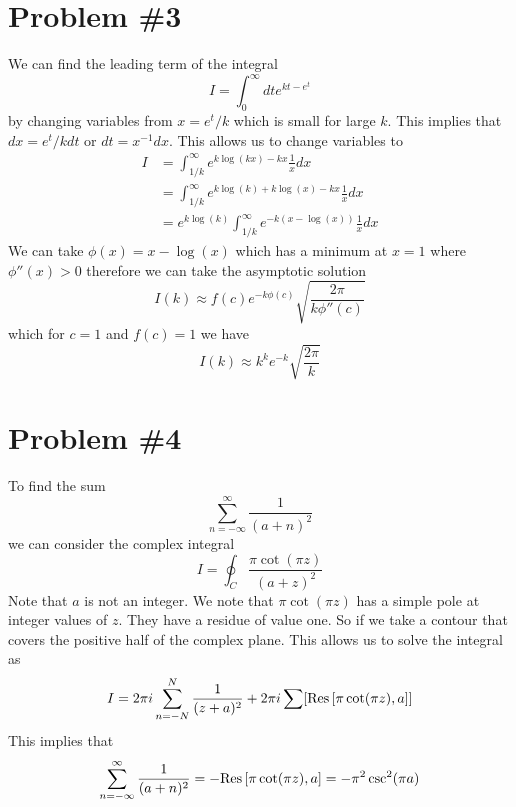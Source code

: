 \documentclass[11pt]{article}
\numberwithin{equation}{section}
\begin{document}
\pagebreak

\section{Problem \#3}
We can find the leading term of the integral
$$I = \int_{0}^{\infty}dte^{kt-e^t}$$
by changing variables from $x = e^{t}/k$ which is small for large $k$. This implies that
$dx = e^{t}/kdt$ or $dt = x^{-1}dx$. This allows us to change variables to
\begin{align*}
I &= \int_{1/k}^{\infty}e^{k\log(kx)-kx}\frac{1}{x}dx\\
&= \int_{1/k}^{\infty}e^{k\log(k)+k\log(x)-kx}\frac{1}{x}dx\\
&= e^{k\log(k)}\int_{1/k}^{\infty}e^{-k(x-\log(x))}\frac{1}{x}dx
\end{align*}
We can take $\phi(x) = x-\log(x)$ which has a minimum at $x=1$ where $\phi''(x)>0$ therefore
we can take the asymptotic solution
$$I(k) \approx f(c)e^{-k\phi(c)}\sqrt{\frac{2\pi}{k\phi''(c)}}$$
which for $c=1$ and $f(c) = 1$ we have
$$I(k) \approx k^ke^{-k}\sqrt{\frac{2\pi}{k}}$$

\pagebreak

\section{Problem \#4}
To find the sum 
$$\sum_{n=-\infty}^{\infty}\frac{1}{(a+n)^2}$$
we can consider the complex integral
$$I = \oint_{C}\frac{\pi\cot(\pi{z})}{(a+z)^2}$$
Note that $a$ is not an integer. We note that $\pi\cot(\pi{z})$ has a simple pole at integer 
values of $z$. They have a residue of value one. So if we take a contour that covers the 
positive half of the complex plane. This allows us to solve the integral as
$$I = 2\pi{i}\sum_{n=-N}^{N}\frac{1}{(z+a)^2} + 2\pi{i}\sum[\textnormal{Res}\left[{\pi\cot(\pi{z})},{a}\right]]$$
This implies that 
$$\sum_{n=-\infty}^{\infty}\frac{1}{(a+n)^2} = -\textnormal{Res}\left[{\pi\cot(\pi{z})},{a}\right] = -\pi^2\csc^2(\pi{a})$$
\end{document}
